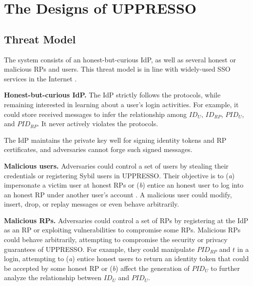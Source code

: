 \section{The Designs of UPPRESSO}
\label{sec:UPPRESSO}


\subsection{Threat Model}
\label{subsec:threatmodel}
The system consists of an honest-but-curious IdP, as well as several honest or malicious RPs and users. This threat model is in line with widely-used SSO services in the Internet \cite{OpenIDConnect,rfc6749, SAML, SAMLIdentifier}.

\noindent \textbf{Honest-but-curious IdP.} The IdP strictly follows the protocols,
 while remaining interested in learning about a user's login activities.
For example, it could store received messages to infer the relationship among $ID_U$, $ID_{RP}$, $PID_{U}$, and $PID_{RP}$.
It never actively violates the protocols.

The IdP maintains the private key well for signing identity tokens and RP certificates, %
and adversaries cannot forge such signed messages.

\noindent \textbf{Malicious users.} Adversaries could control a set of users by stealing their credentials or registering Sybil users in UPPRESSO.
 Their objective is to (\emph{a}) impersonate a victim user at honest RPs or (\emph{b}) entice an honest user to log into an honest RP under another user's account  \cite{SPRESSO, FettKS14}.
A malicious user could modify, insert, drop, or replay messages or even behave arbitrarily.

\noindent \textbf{Malicious RPs.}
Adversaries could control a set of RPs by registering at the IdP as an RP or exploiting vulnerabilities to compromise some RPs.
Malicious RPs could behave arbitrarily, attempting to compromise the security or privacy guarantees of UPPRESSO.
For example, they could manipulate $PID_{RP}$ and $t$ in a login, attempting to (\emph{a}) entice honest users to return an identity token that could be accepted by some honest RP or (\emph{b}) affect the generation of $PID_U$ to further analyze the relationship between $ID_U$ and $PID_U$.

